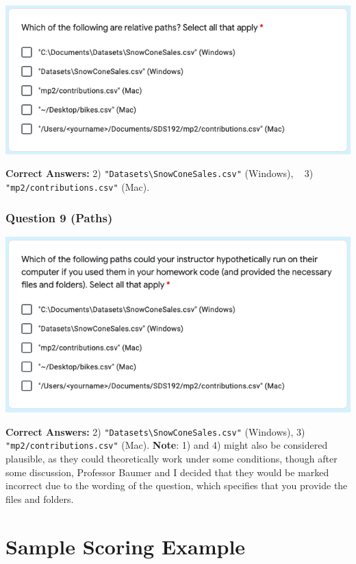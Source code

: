 \documentclass[12pt,twoside]{reedthesis}
\begin{document}
\includegraphics[width=0.8\linewidth]{figure/appendix/test-8}

\textbf{Correct Answers:} 2) \texttt{"Datasets\textbackslash{}SnowConeSales.csv"} (Windows), ~
3) \texttt{"mp2/contributions.csv"} (Mac).

\hypertarget{question-9-paths}{%
\subsubsection{Question 9 (Paths)}\label{question-9-paths}}

\includegraphics[width=0.8\linewidth]{figure/appendix/test-9}

\textbf{Correct Answers:} 2) \texttt{"Datasets\textbackslash{}SnowConeSales.csv"} (Windows), 3) \texttt{"mp2/contributions.csv"} (Mac). \textbf{Note}: 1) and 4) might also be considered plausible, as they could theoretically work under some conditions, though after some discussion, Professor Baumer and I decided that they would be marked incorrect due to the wording of the question, which specifies that you provide the files and folders.

\hypertarget{sample-scoring-example}{%
\section{Sample Scoring Example}\label{sample-scoring-example}}
\end{document}
